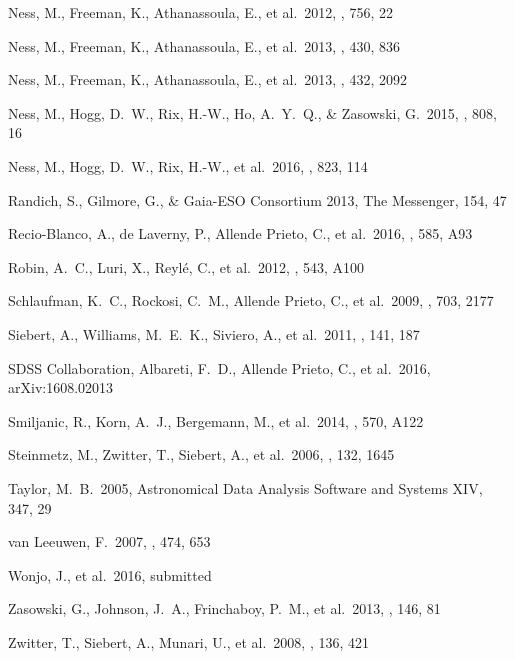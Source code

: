 \documentclass[preprint,trackchanges]{aastex}
\begin{document}
\begin{thebibliography}{dummy}
 Ness, M., Freeman, K., Athanassoula, E., et al.\ 2012, \apj, 756, 22 

 Ness, M., Freeman, K., Athanassoula, E., et al.\ 2013, \mnras, 430, 836 

 Ness, M., Freeman, K., Athanassoula, E., et al.\ 2013, \mnras, 432, 2092 

 Ness, M., Hogg, D.~W., Rix, H.-W., Ho, A.~Y.~Q., \& Zasowski, G.\ 2015, \apj, 808, 16 

 Ness, M., Hogg, D.~W., Rix, H.-W., et al.\ 2016, \apj, 823, 114 

 Randich, S., Gilmore, G., \& Gaia-ESO Consortium 2013, The Messenger, 154, 47 

 Recio-Blanco, A., de Laverny, P., Allende Prieto, C., et al.\ 2016, \aap, 585, A93 

 Robin, A.~C., Luri, X., Reyl{\'e}, C., et al.\ 2012, \aap, 543, A100 

 Schlaufman, K.~C., Rockosi, C.~M., Allende Prieto, C., et al.\ 2009, \apj, 703, 2177 

 Siebert, A., Williams, M.~E.~K., Siviero, A., et al.\ 2011, \aj, 141, 187 

 SDSS Collaboration, Albareti, F.~D., Allende Prieto, C., et al.\ 2016, arXiv:1608.02013 

 Smiljanic, R., Korn, A.~J., Bergemann, M., et al.\ 2014, \aap, 570, A122 

 Steinmetz, M., Zwitter, T., Siebert, A., et al.\ 2006, \aj, 132, 1645 

 Taylor, M.~B.\ 2005, Astronomical Data Analysis Software and Systems XIV, 347, 29 

 van Leeuwen, F.\ 2007, \aap, 474, 653 

 Wonjo, J., et al.\ 2016, submitted

 Zasowski, G., Johnson, J.~A., Frinchaboy, P.~M., et al.\ 2013, \aj, 146, 81 

 Zwitter, T., Siebert, A., Munari, U., et al.\ 2008, \aj, 136, 421 

\end{thebibliography}
\end{document}
